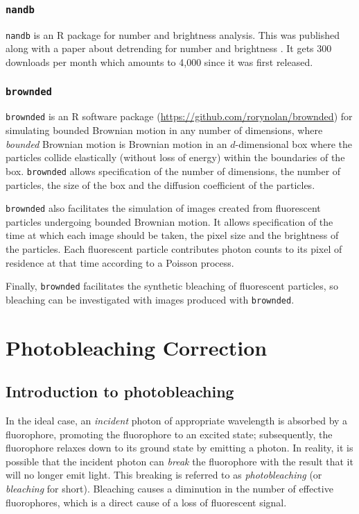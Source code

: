 \documentclass[12pt,]{book}
\theoremstyle{definition}
\theoremstyle{definition}
\theoremstyle{definition}
\theoremstyle{remark}
\begin{document}
\subsection{\texorpdfstring{\texttt{nandb}}{nandb}}\label{nandb}

\texttt{nandb} is an R package for number and brightness analysis. This
was published along with a paper about detrending for number and
brightness \citep{nandb}. It gets 300 downloads per month which amounts
to 4,000 since it was first released.

\subsection{\texorpdfstring{\texttt{brownded}}{brownded}}\label{brownded}

\texttt{brownded} is an R software package
(\url{https://github.com/rorynolan/brownded}) for simulating bounded
Brownian motion in any number of dimensions, where \emph{bounded}
Brownian motion is Brownian motion in an \(d\)-dimensional box where the
particles collide elastically (without loss of energy) within the
boundaries of the box. \texttt{brownded} allows specification of the
number of dimensions, the number of particles, the size of the box and
the diffusion coefficient of the particles.

\texttt{brownded} also facilitates the simulation of images created from
fluorescent particles undergoing bounded Brownian motion. It allows
specification of the time at which each image should be taken, the pixel
size and the brightness of the particles. Each fluorescent particle
contributes photon counts to its pixel of residence at that time
according to a Poisson process.

Finally, \texttt{brownded} facilitates the synthetic bleaching of
fluorescent particles, so bleaching can be investigated with images
produced with \texttt{brownded}.

\chapter{Photobleaching Correction}\label{photobleaching-correction}

\section{Introduction to
photobleaching}\label{introduction-to-photobleaching}

In the ideal case, an \emph{incident} photon of appropriate wavelength
is absorbed by a fluorophore, promoting the fluorophore to an excited
state; subsequently, the fluorophore relaxes down to its ground state by
emitting a photon. In reality, it is possible that the incident photon
can \emph{break} the fluorophore with the result that it will no longer
emit light. This breaking is referred to as \emph{photobleaching} (or
\emph{bleaching} for short). Bleaching causes a diminution in the number
of effective fluorophores, which is a direct cause of a loss of
fluorescent signal.
\end{document}
